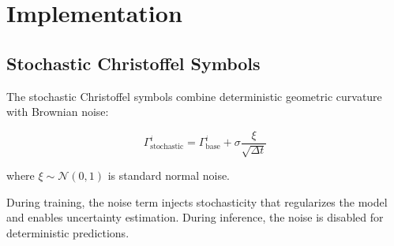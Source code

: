 \documentclass[12pt,a4paper]{article}
\begin{document}
\section{Implementation}

\subsection{Stochastic Christoffel Symbols}

The stochastic Christoffel symbols combine deterministic geometric curvature with Brownian noise:

\begin{equation}
\Gamma^i_{\text{stochastic}} = \Gamma^i_{\text{base}} + \sigma \frac{\xi}{\sqrt{\Delta t}}
\end{equation}

where $\xi \sim \mathcal{N}(0, 1)$ is standard normal noise.

During training, the noise term injects stochasticity that regularizes the model and enables uncertainty estimation. During inference, the noise is disabled for deterministic predictions.
\end{document}
